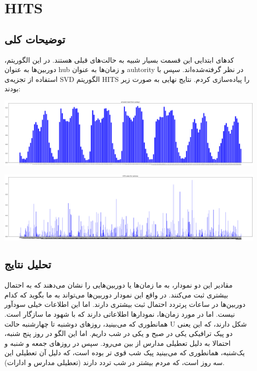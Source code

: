 \section{HITS}

\subsection{توضیحات کلی}

کدهای ابتدایی این قسمت بسیار شبیه به حالت‌های قبلی هستند. در این الگوریتم، 
دوربین‌ها به عنوان
hub
 و زمان‌ها به عنوان 
auhtority
در نظر گرفته‌شده‌اند. سپس با استفاده از تجزیه‌ی 
SVD
الگوریتم 
HITS
را پیاده‌سازی کردم. نتایج نهایی به صورت زیر بودند: 

\includegraphics[scale=0.2]{images/HITS/1.png}

\includegraphics[scale=0.2]{images/HITS/2.png}


\subsection{تحلیل نتایج}
مقادیر این دو نمودار، به ما زمان‌ها یا دوربین‌هایی را نشان‌ می‌دهند که به احتمال بیشتری ثبت می‌کنند. در واقع این نمودار دوربین‌ها می‌تواند 
به ما بگوید که کدام دوربین‌ها در ساعات پرتردد احتمال ثبت بیشتری دارند. اما این اطلاعات خیلی سود‌آور نیست. 
اما در مورد زمان‌ها، نمودار‌ها اطلاعاتی دارند که با شهود ما سازگار است. همانطوری که می‌بینید، روز‌های دوشنبه تا 
چهارشنبه حالت 
U
شکل دارند، که این یعنی دو پیک ترافیکی یکی در صبح و یکی در شب داریم. اما این 
الگو در روز پنج شنبه، احتمالا به دلیل تعطیلی مدارس از بین می‌رود. سپس 
در روز‌های جمعه و شنبه و یک‌شنبه، همانطوری که می‌بینید پیک شب قوی تر بوده است، که دلیل آن 
تعطیلی این سه روز است، که مردم بیشتر در شب تردد دارند (تعطیلی مدارس و ادارات). 
